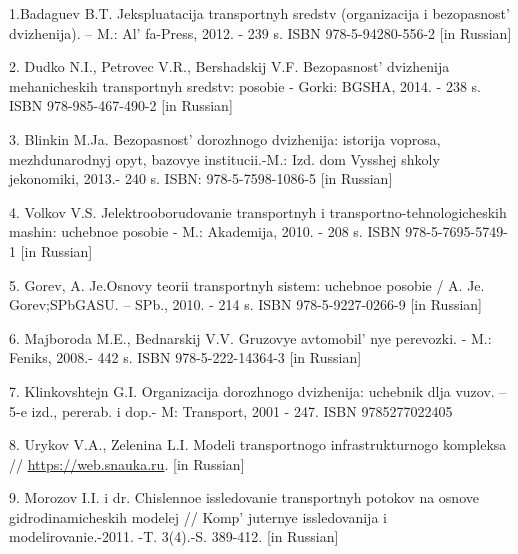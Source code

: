 \begin{references}
1.Badaguev B.T. Jekspluatacija transportnyh sredstv (organizacija i
bezopasnost'{} dvizhenija). -- M.:
Al' fa-Press, 2012. - 239 s. ISBN 978-5-94280-556-2 {[}in
Russian{]}

2. Dudko N.I., Petrovec V.R., Bershadskij V.F.
Bezopasnost'{} dvizhenija mehanicheskih transportnyh
sredstv: posobie - Gorki: BGSHA, 2014. - 238 s. ISBN 978-985-467-490-2
{[}in Russian{]}

3. Blinkin M.Ja. Bezopasnost'{} dorozhnogo dvizhenija:
istorija voprosa, mezhdunarodnyj opyt, bazovye institucii.-M.: Izd. dom
Vysshej shkoly jekonomiki, 2013.- 240 s. ISBN: 978-5-7598-1086-5 {[}in
Russian{]}

4. Volkov V.S. Jelektrooborudovanie transportnyh i
transportno-tehnologicheskih mashin: uchebnoe posobie - M.: Akademija,
2010. - 208 s. ISBN 978-5-7695-5749-1 {[}in Russian{]}

5. Gorev, A. Je.Osnovy teorii transportnyh sistem: uchebnoe posobie / A.
Je. Gorev;SPbGASU. -- SPb., 2010. - 214 s. ISBN 978-5-9227-0266-9 {[}in
Russian{]}

6. Majboroda M.E., Bednarskij V.V. Gruzovye
avtomobil' nye perevozki. - M.: Feniks, 2008.- 442 s.
ISBN 978-5-222-14364-3 {[}in Russian{]}

7. Klinkovshtejn G.I. Organizacija dorozhnogo dvizhenija: uchebnik dlja
vuzov. -- 5-e izd., pererab. i dop.- M: Transport, 2001 - 247. ISBN
9785277022405

8. Urykov V.A., Zelenina L.I. Modeli transportnogo infrastrukturnogo
kompleksa //
\href{https://web.snauka.ru/issues/2014.\%2018.06.2020}{https://web.snauka.ru}. {[}in Russian{]}

9. Morozov I.I. i dr. Chislennoe issledovanie transportnyh potokov na
osnove gidrodinamicheskih modelej // Komp' juternye
issledovanija i modelirovanie.-2011. -T. 3(4).-S. 389-412. {[}in
Russian{]}
\end{references}

